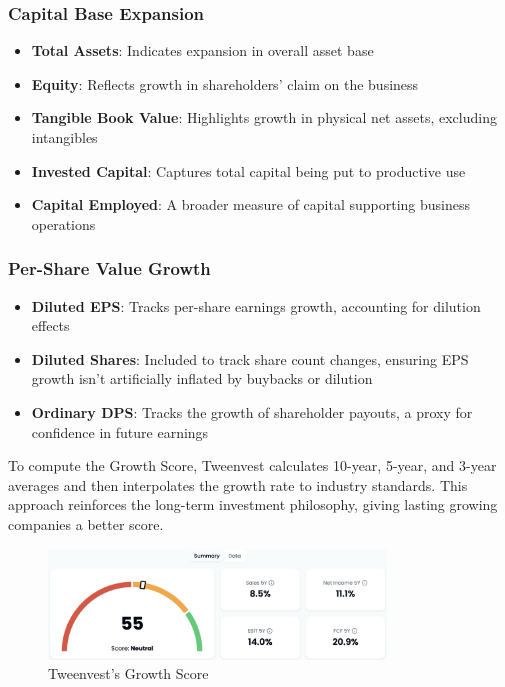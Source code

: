 \documentclass[11pt,english,a4paper,hidelinks]{book}
\begin{document}
\subsubsection{Capital Base Expansion}
\begin{itemize}
    \item \textbf{Total Assets}: Indicates expansion in overall asset base
    \item \textbf{Equity}: Reflects growth in shareholders' claim on the business
    \item \textbf{Tangible Book Value}: Highlights growth in physical net assets, excluding intangibles
    \item \textbf{Invested Capital}: Captures total capital being put to productive use
    \item \textbf{Capital Employed}: A broader measure of capital supporting business operations
\end{itemize}

\subsubsection{Per-Share Value Growth}
\begin{itemize}
    \item \textbf{Diluted EPS}: Tracks per-share earnings growth, accounting for dilution effects
    \item \textbf{Diluted Shares}: Included to track share count changes, ensuring EPS growth isn't artificially inflated by buybacks or dilution
    \item \textbf{Ordinary DPS}: Tracks the growth of shareholder payouts, a proxy for confidence in future earnings
\end{itemize}

\vspace{0.5cm}
\noindent To compute the Growth Score, Tweenvest calculates 10-year, 5-year, and 3-year averages and then interpolates the growth rate to industry standards. This approach reinforces the long-term investment philosophy, giving lasting growing companies a better score.

\begin{figure}[H]
    \centering
    \includegraphics[width=0.8\textwidth]{images/tweenvest/growth score.png}
    \caption{Tweenvest's Growth Score}
    \label{fig:growth_score}
\end{figure}
\end{document}
